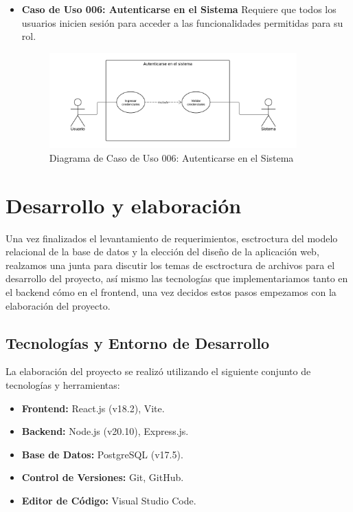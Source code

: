 \documentclass[12pt,letterpaper,spanish]{report}
\begin{document}
\begin{itemize}
    \item \textbf{Caso de Uso 006: Autenticarse en el Sistema} 
    Requiere que todos los usuarios inicien sesión para acceder a las funcionalidades permitidas para su rol.



\begin{figure}[H]
  \centering
  \includegraphics[width=0.9\textwidth]{DIACU06.png}
  \caption{Diagrama de Caso de Uso 006: Autenticarse en el Sistema}\label{d06}
\end{figure}


\end{itemize}
\section{Desarrollo y elaboración}
Una vez finalizados el levantamiento de requerimientos, esctroctura del modelo relacional de la base de datos y la elección del diseño de la aplicación web, realzamos una junta para discutir los temas de esctroctura de archivos para el desarrollo del proyecto, así mismo las tecnologías que implementariamos tanto en el backend cómo en el frontend, una vez decidos estos pasos empezamos con la elaboración del proyecto.

\subsection{Tecnologías y Entorno de Desarrollo}
\label{sec:tecnologias_entorno}

La elaboración del proyecto se realizó utilizando el siguiente conjunto de tecnologías y herramientas:
\begin{itemize}
    \item \textbf{Frontend:} React.js (v18.2), Vite.
    \item \textbf{Backend:} Node.js (v20.10), Express.js.
    \item \textbf{Base de Datos:} PostgreSQL (v17.5).
    \item \textbf{Control de Versiones:} Git, GitHub.
    \item \textbf{Editor de Código:} Visual Studio Code.
\end{itemize}
\end{document}
